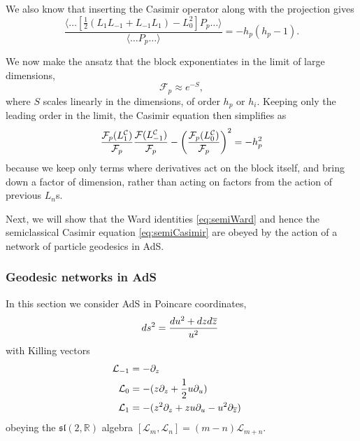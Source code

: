 \documentclass[12pt]{article}
\def\zb{\overline{z}}
\newcommand{\sltwo}{$\lie{sl}(2,\RR)$ }
\def\Lc{\mathcal{L}}
\def\p{\partial}
\newcommand{\RR}{\mathbb{R}}
\newcommand{\lie}[1]{\mathfrak{#1}}
\begin{document}
We also know that inserting the Casimir operator along with the projection gives
\begin{equation}
\frac{\langle \ldots \left[\frac{1}{2}(L_1L_{-1}+L_{-1}L_1)-L_0^2 \right]P_p \ldots \rangle}
{\langle \ldots P_p \ldots\rangle}=-h_{p}(h_{p}-1). \end{equation}

We now make the ansatz that the block exponentiates in the limit of large dimensions,
\begin{equation} \mathcal{F}_p \approx e^{-S}, \end{equation}
where $S$ scales linearly in the dimensions, of order $h_p$ or $h_i$. Keeping only the leading order in the limit, the Casimir equation then simplifies as
\begin{equation}
\label{eq:semiCasimir} \frac{\mathcal{F}_p(L_1^{\cal{C}})}{\mathcal{F}_p}\frac{\mathcal{F}(L_{-1}^{\cal{C}})}{\mathcal{F}_p}
-\left(\frac{\mathcal{F}_p(L_0^{\cal{C}})}{\mathcal{F}_p}\right)^2=-h_p^2
\end{equation}
%
because we keep only terms where derivatives act on the block itself, and bring down a factor of dimension, rather than acting on factors from the action of previous $L_n$s.

Next, we will show that the Ward identities \cref{eq:semiWard} and hence the semiclassical Casimir equation \cref{eq:semiCasimir} are obeyed by the action of a network of particle geodesics in AdS.

\subsubsection{Geodesic networks in AdS}
\label{sec:adsnetwork}
In this section we consider AdS in Poincare coordinates,
%
\begin{equation}
ds^2 = {du^2 + dz d\zb \over u^2}~
\end{equation}
with Killing vectors
%
\begin{align}
	\Lc_{-1} &= -\p_z \cr
\Lc_0 &= - (z\p_z +{1\over 2} u\p_u)  \cr
\Lc_1 &= - ( z^2 \p_z +z u\p_u -u^2 \p_{\zb} )
\end{align}
%
obeying the \sltwo algebra $[\Lc_{m},\Lc_{n}]=(m-n)\Lc_{m+n}$.
\end{document}
